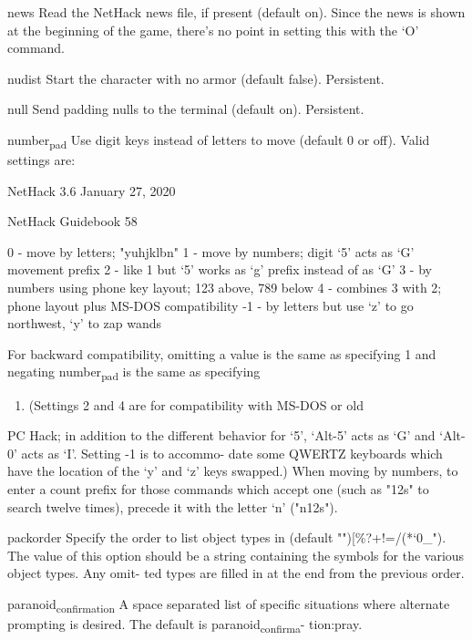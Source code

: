 \documentclass[11pt]{article}
\begin{document}
news
 Read the NetHack news file, if present (default on). Since the
 news is shown at the beginning of the game, there's no point in
 setting this with the `O' command.

nudist
 Start the character with no armor (default false). Persistent.

null
 Send padding nulls to the terminal (default on). Persistent.

number\textsubscript{pad}
 Use digit keys instead of letters to move (default 0 or off).
 Valid settings are:


NetHack 3.6                   January 27, 2020





NetHack Guidebook                       58



 0 - move by letters; "yuhjklbn"
 1 - move by numbers; digit `5' acts as `G' movement prefix
 2 - like 1 but `5' works as `g' prefix instead of as `G'
 3 - by numbers using phone key layout; 123 above, 789 below
 4 - combines 3 with 2; phone layout plus MS-DOS compatibility
-1 - by letters but use `z' to go northwest, `y' to zap wands

For backward compatibility, omitting a value is the same as
specifying 1 and negating number\textsubscript{pad} is the same as specifying
\begin{enumerate}
\item (Settings 2 and 4 are for compatibility with MS-DOS or old
\end{enumerate}
PC Hack; in addition to the different behavior for `5', `Alt-5'
acts as `G' and `Alt-0' acts as `I'. Setting -1 is to accommo-
date some QWERTZ keyboards which have the location of the `y'
and `z' keys swapped.) When moving by numbers, to enter a
count prefix for those commands which accept one (such as "12s"
to search twelve times), precede it with the letter `n'
("n12s").

packorder
 Specify  the  order  to  list  object types in (default
 "")[\%?+!=/(*`0\_"). The value of this option should be a string
 containing the symbols for the various object types. Any omit-
 ted types are filled in at the end from the previous order.

paranoid\textsubscript{confirmation}
 A space separated list of specific situations where alternate
 prompting  is desired.  The default is paranoid\textsubscript{confirma}-
 tion:pray.
\end{document}
